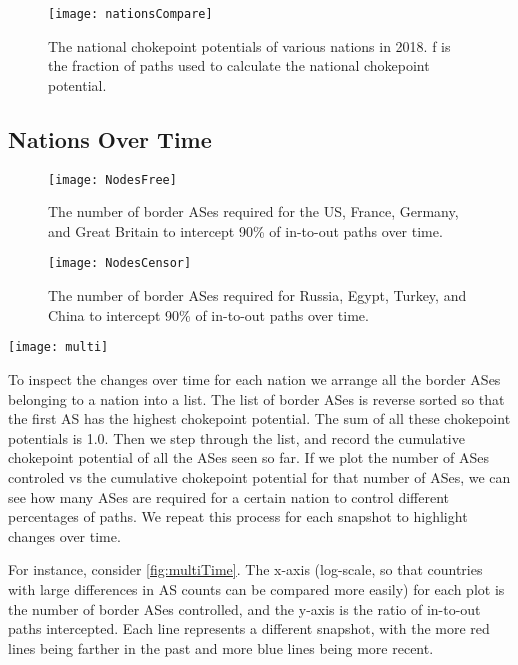 \begin{figure}[ht]
	\centering
	\texttt{[image: nationsCompare]}
	\caption{The national chokepoint potentials of various nations in 2018. f is the
	fraction of paths used to calculate the national chokepoint potential.}\label{fig:nationsCompare}
\end{figure}

\subsection{Nations Over Time}

\begin{figure}
	\centering
	\texttt{[image: NodesFree]}
	\caption{The number of border ASes required for the US, France, Germany, and Great Britain to intercept 90\% of in-to-out paths over time.}\label{fig:nodesFree}
\end{figure}
\begin{figure}
	\centering
	\texttt{[image: NodesCensor]}
	\caption{The number of border ASes required for Russia, Egypt, Turkey, and China to intercept 90\% of in-to-out paths over time.}\label{fig:nodesCensor}
\end{figure}
\begin{figure*}
	\centering
	\texttt{[image: multi]}
	\caption{The capability for various nations to intercept in-to-out paths over multiple years \timerange. Each plot shows for a number of border ASes controlled (x-axis),
	what fraction of in-to-out paths are intercepted (y-axis). Years in blue are more recent, and years in red are further in the past.}\label{fig:multiTime}
\end{figure*}

To inspect the changes over time for each nation we arrange all the border ASes
belonging to a nation into a list. The list of border ASes is reverse sorted so
that the first AS has the highest chokepoint potential. The sum of all these
chokepoint potentials is 1.0. Then we step through the list, and record the
cumulative chokepoint potential of all the ASes seen so far. If we plot the
number of ASes controled vs the cumulative chokepoint potential for that number
of ASes, we can see how many ASes are required for a certain nation to control
different percentages of paths. We repeat this process for each snapshot to
highlight changes over time.

For instance, consider \figurename \ref{fig:multiTime}.  The x-axis (log-scale,
so that countries with large differences in AS counts can be compared more
easily) for each plot is the number of border ASes controlled, and the y-axis
is the ratio of in-to-out paths intercepted. Each line represents a different
snapshot, with the more red lines being farther in the past and more blue lines
being more recent.

